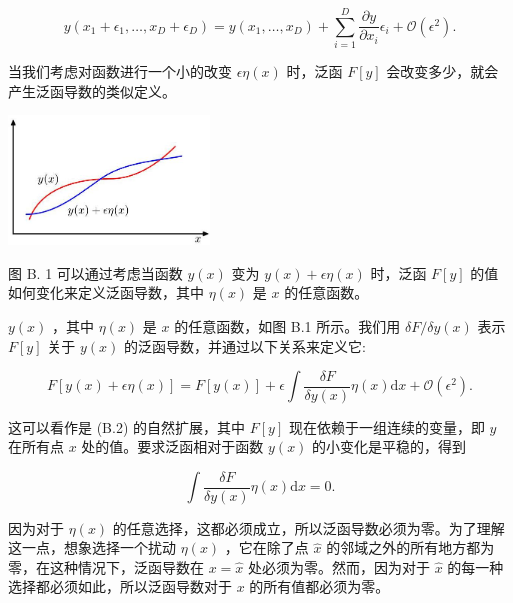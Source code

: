 \documentclass[10pt]{article}
\begin{document}
\[
y\left( {{x}_{1} + {\epsilon }_{1},\ldots ,{x}_{D} + {\epsilon }_{D}}\right)  = y\left( {{x}_{1},\ldots ,{x}_{D}}\right)  + \mathop{\sum }\limits_{{i = 1}}^{D}\frac{\partial y}{\partial {x}_{i}}{\epsilon }_{i} + \mathcal{O}\left( {\epsilon }^{2}\right) . \tag{B.2}
\]

当我们考虑对函数进行一个小的改变 \({\epsilon \eta }\left( x\right)\) 时，泛函 \(F\left\lbrack  y\right\rbrack\) 会改变多少，就会产生泛函导数的类似定义。

\begin{center}
\includegraphics[max width=0.4\textwidth]{images/0194e279-9b28-703a-88f4-c3ac21e2010d_637_1010_344_535_345_0.jpg}
\end{center}
\hspace*{3em} 

图 B. 1 可以通过考虑当函数 \(y\left( x\right)\) 变为 \(y\left( x\right)  + {\epsilon \eta }\left( x\right)\) 时，泛函 \(F\left\lbrack  y\right\rbrack\) 的值如何变化来定义泛函导数，其中 \(\eta \left( x\right)\) 是 \(x\) 的任意函数。

\(y\left( x\right)\) ，其中 \(\eta \left( x\right)\) 是 \(x\) 的任意函数，如图 B.1 所示。我们用 \({\delta F}/{\delta y}\left( x\right)\) 表示 \(F\left\lbrack  y\right\rbrack\) 关于 \(y\left( x\right)\) 的泛函导数，并通过以下关系来定义它:

\[
F\left\lbrack  {y\left( x\right)  + {\epsilon \eta }\left( x\right) }\right\rbrack   = F\left\lbrack  {y\left( x\right) }\right\rbrack   + \epsilon \int \frac{\delta F}{{\delta y}\left( x\right) }\eta \left( x\right) \mathrm{d}x + \mathcal{O}\left( {\epsilon }^{2}\right) . \tag{B.3}
\]

这可以看作是 (B.2) 的自然扩展，其中 \(F\left\lbrack  y\right\rbrack\) 现在依赖于一组连续的变量，即 \(y\) 在所有点 \(x\) 处的值。要求泛函相对于函数 \(y\left( x\right)\) 的小变化是平稳的，得到

\[
\int \frac{\delta F}{{\delta y}\left( x\right) }\eta \left( x\right) \mathrm{d}x = 0. \tag{B.4}
\]

因为对于 \(\eta \left( x\right)\) 的任意选择，这都必须成立，所以泛函导数必须为零。为了理解这一点，想象选择一个扰动 \(\eta \left( x\right)\) ，它在除了点 \(\widehat{x}\) 的邻域之外的所有地方都为零，在这种情况下，泛函导数在 \(x = \widehat{x}\) 处必须为零。然而，因为对于 \(\widehat{x}\) 的每一种选择都必须如此，所以泛函导数对于 \(x\) 的所有值都必须为零。
\end{document}

